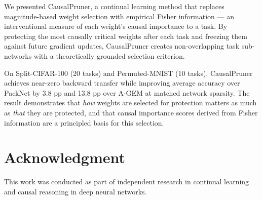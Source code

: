 \documentclass[conference]{IEEEtran}
\begin{document}
We presented CausalPruner, a continual learning method that replaces magnitude-based
weight selection with empirical Fisher information — an interventional measure of each
weight's causal importance to a task.  By protecting the most causally critical weights
after each task and freezing them against future gradient updates, CausalPruner creates
non-overlapping task sub-networks with a theoretically grounded selection criterion.

On Split-CIFAR-100 (20 tasks) and Permuted-MNIST (10 tasks), CausalPruner achieves
near-zero backward transfer while improving average accuracy over PackNet by 3.8 pp and
13.8 pp over A-GEM at matched network sparsity.  The result demonstrates that \emph{how}
weights are selected for protection matters as much as \emph{that} they are protected,
and that causal importance scores derived from Fisher information are a principled basis
for this selection.

\section*{Acknowledgment}

This work was conducted as part of independent research in continual learning and
causal reasoning in deep neural networks.
\end{document}
